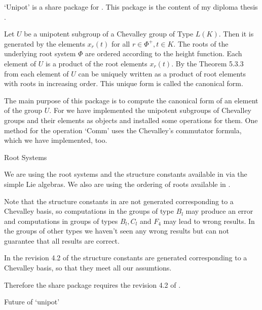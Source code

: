

`Unipot' is a share package for {} \cite{GAP4}. This package is the
content of my diploma thesis \cite{SH2000}.

Let $U$ be a unipotent subgroup of a Chevalley group of Type $L(K)$. Then
it is generated by the elements $x_r(t)$ for all $r\in \Phi^+,t\in K$. The
roots of the underlying root system $\Phi$ are ordered according to the
height function. Each element of $U$ is a product of the root elements
$x_r(t)$. By the Theorem 5.3.3 from \cite{Carter72} each element of $U$
can be uniquely written as a product of root elements with roots in
increasing order. This unique form is called the canonical form.

The main purpose of this package is to compute the canonical form of an
element of the group $U$. For we have implemented the unipotent subgroups
of Chevalley groups and their elements as {\GAP} objects and installed
some operations for them. One method for the operation `Comm' uses the
Chevalley's commutator formula, which we have implemented, too.

\>Root Systems

We are using the root systems and the structure constants available in
{\GAP} via the simple Lie algebras. We also are using the ordering of
roots available in {\GAP}.

Note that the structure constants in {} are not generated
corresponding to a Chevalley basis, so computations in the groups of
type $B_l$ may produce an error and computations in groups of types $B_l, 
C_l$ and $F_4$ may lead to wrong results. In the groups of other types
we haven't seen any wrong results but can not guarantee that all results
are correct.

In the revision 4.2 of {\GAP} the structure constants are generated
corresponding to a Chevalley basis, so that they meet all our assumtions.

Therefore the share package requires the revision 4.2 of {\GAP}.

\> Future of `unipot'

